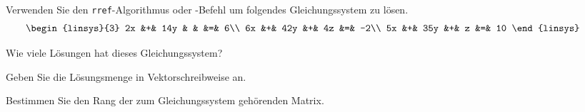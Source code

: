 Verwenden Sie den \texttt{rref}-Algorithmus oder -Befehl um folgendes
Gleichungssystem zu lösen.
\[
\begin{linsys}{3}
2x &+& 14y & &    &=&  6\\
6x &+& 42y &+& 4z &=& -2\\
5x &+& 35y &+&  z &=& 10
\end{linsys}
\qquad
\]
\begin{teilaufgaben}
\item
Wie viele Lösungen hat dieses Gleichungssystem?
\item
Geben Sie die Lösungsmenge in Vektorschreibweise an.
\item 
Bestimmen Sie den Rang der zum Gleichungssystem gehörenden Matrix.
\end{teilaufgaben}


